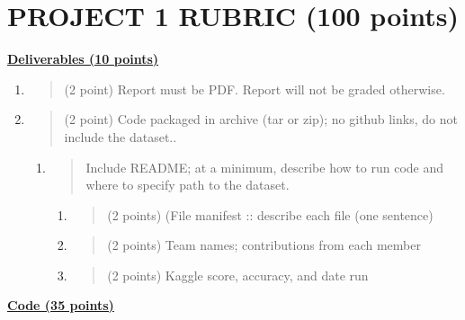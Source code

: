\documentclass[
]{article}
\author{}
\date{}
\begin{document}
\hypertarget{project-1-rubric-100-points}{%
\section{PROJECT 1 RUBRIC (100
points)}\label{project-1-rubric-100-points}}

\textbf{\uline{Deliverables (10 points)}}

\begin{enumerate}
\def\labelenumi{\arabic{enumi}.}
\item
  \begin{quote}
  (2 point) Report must be PDF. Report will not be graded otherwise.
  \end{quote}
\item
  \begin{quote}
  (2 point) Code packaged in archive (tar or zip); no github links, do
  not include the dataset..
  \end{quote}

  \begin{enumerate}
  \def\labelenumii{\alph{enumii}.}
  \item
    \begin{quote}
    Include README; at a minimum, describe how to run code and where to
    specify path to the dataset.
    \end{quote}

    \begin{enumerate}
    \def\labelenumiii{\roman{enumiii}.}
    \item
      \begin{quote}
      (2 points) (File manifest :: describe each file (one sentence)
      \end{quote}
    \item
      \begin{quote}
      (2 points) Team names; contributions from each member
      \end{quote}
    \item
      \begin{quote}
      (2 points) Kaggle score, accuracy, and date run
      \end{quote}
    \end{enumerate}
  \end{enumerate}
\end{enumerate}

\textbf{\uline{Code (35 points)}}
\end{document}
